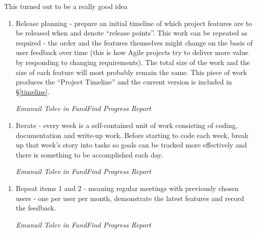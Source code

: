 This turned out to be a really good idea 

\begin{shadequote}
\begin{enumerate}
	\setcounter{enumi}{\thetmpc}
	\item Release planning - prepare an initial timeline of which project features are to be released when and denote ``release points''. This work can be repeated as required - the order and the features themselves might change on the basis of user feedback over time (this is how Agile projects try to deliver more value by responding to changing requirements). The total size of the work and the size of each feature will most probably remain the same. This piece of work produces the ``Project Timeline'' and the current version is included in \S\ref{timeline}.
	\par\emph{Emanuil Tolev in FundFind Progress Report \cite{progress-report}}
	\setcounter{tmpc}{\theenumi}
\end{enumerate}
\end{shadequote}

\begin{shadequote}
\begin{enumerate}
	\setcounter{enumi}{\thetmpc}
	\item Iterate - every week is a self-contained unit of work consisting of coding, documentation and write-up work. Before starting to code each week, break up that week's story into tasks so goals can be tracked more effectively and there is something to be accomplished each day.
	\par\emph{Emanuil Tolev in FundFind Progress Report \cite{progress-report}}
	\setcounter{tmpc}{\theenumi}
\end{enumerate}
\end{shadequote}

\begin{shadequote}
\begin{enumerate}
	\setcounter{enumi}{\thetmpc}
	\item Repeat items 1 and 2 - meaning regular meetings with previously chosen users - one per user per month, demonstrate the latest features and record the feedback.
	\par\emph{Emanuil Tolev in FundFind Progress Report \cite{progress-report}}
	\setcounter{tmpc}{\theenumi}
\end{enumerate}
\end{shadequote}
	


